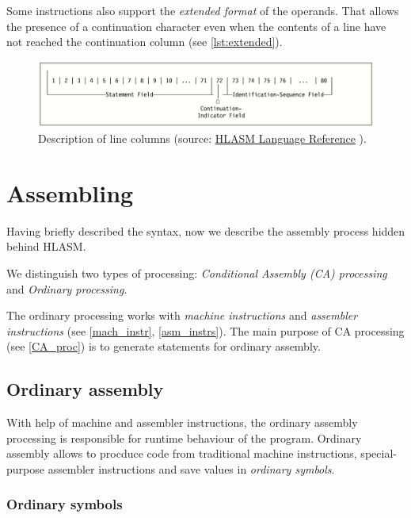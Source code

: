 Some instructions also support the \emph{extended format} of the operands. That allows the presence of a continuation character even when the contents of a line have not reached the continuation column (see \cref{lst:extended}).

\begin{figure}
	\includegraphics[width=\textwidth]{img/line}
	\caption{Description of line columns (source: \href{https://www-01.ibm.com/servers/resourcelink/svc00100.nsf/pages/zOSV2R3sc264940/$file/asmr1023.pdf}{HLASM Language Reference} ).}
	\label{fig01:line}
\end{figure}


\section{Assembling}
\label{Assembling}

Having briefly described the syntax, now we describe the assembly process hidden behind HLASM. 

We distinguish two types of processing: \emph{Conditional Assembly (CA) processing} and \emph{Ordinary processing}.

The ordinary processing works with \emph{machine instructions} and \emph{assembler instructions} (see \cref{mach_instr}, \cref{asm_instrs}). The main purpose of CA processing (see \cref{CA_proc}) is to generate statements for ordinary assembly.

\subsection{Ordinary assembly}

With help of machine and assembler instructions, the ordinary assembly processing is responsible for runtime behaviour of the program. Ordinary assembly allows to procduce code from traditional machine instructions, special-purpose assembler instructions and save values in \emph{ordinary symbols}.

\subsubsection{Ordinary symbols}

